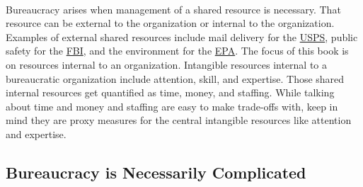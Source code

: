 \ \\

Bureaucracy arises when management of a shared resource is necessary.
That resource can be external to the organization or internal to the organization. Examples of external shared resources include mail delivery for the \href{https://en.wikipedia.org/wiki/United_States_Postal_Service}{USPS},%
%
\iftoggle{WPinmargin}{\marginpar{$>$Wikipedia: USPS}}{}
public safety for the \href{https://en.wikipedia.org/wiki/Federal_Bureau_of_Investigation}{FBI}, 
and the environment for the \href{https://en.wikipedia.org/wiki/United_States_Environmental_Protection_Agency}{EPA}. 
The focus of this book is on resources internal to an organization. Intangible resources internal to a bureaucratic organization include attention, skill, and expertise. Those shared internal resources get quantified as time, money, and staffing. While talking about time and money and staffing are easy to make trade-offs with, keep in mind they are proxy measures for the central intangible resources like attention and expertise.

\subsection*{Bureaucracy is Necessarily Complicated}

